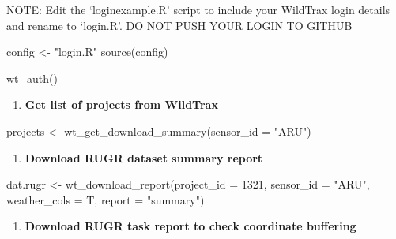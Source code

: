 \documentclass[
]{article}
\newenvironment{Shaded}{\begin{snugshade}}{\end{snugshade}}
\newcommand{\AttributeTok}[1]{\textcolor[rgb]{0.77,0.63,0.00}{#1}}
\newcommand{\DecValTok}[1]{\textcolor[rgb]{0.00,0.00,0.81}{#1}}
\newcommand{\FunctionTok}[1]{\textcolor[rgb]{0.00,0.00,0.00}{#1}}
\newcommand{\NormalTok}[1]{#1}
\newcommand{\OtherTok}[1]{\textcolor[rgb]{0.56,0.35,0.01}{#1}}
\newcommand{\StringTok}[1]{\textcolor[rgb]{0.31,0.60,0.02}{#1}}
\providecommand{\tightlist}{%
  \setlength{\itemsep}{0pt}\setlength{\parskip}{0pt}}
\begin{document}
NOTE: Edit the `loginexample.R' script to include your WildTrax login
details and rename to `login.R'. DO NOT PUSH YOUR LOGIN TO GITHUB

\begin{Shaded}
\begin{Highlighting}[]
\NormalTok{config }\OtherTok{\textless{}{-}} \StringTok{"login.R"}
\FunctionTok{source}\NormalTok{(config)}

\FunctionTok{wt\_auth}\NormalTok{()}
\end{Highlighting}
\end{Shaded}

\begin{enumerate}
\def\labelenumi{\arabic{enumi}.}
\setcounter{enumi}{2}
\tightlist
\item
  \textbf{Get list of projects from WildTrax}
\end{enumerate}

\begin{Shaded}
\begin{Highlighting}[]
\NormalTok{projects }\OtherTok{\textless{}{-}} \FunctionTok{wt\_get\_download\_summary}\NormalTok{(}\AttributeTok{sensor\_id =} \StringTok{"ARU"}\NormalTok{)}
\end{Highlighting}
\end{Shaded}

\begin{enumerate}
\def\labelenumi{\arabic{enumi}.}
\setcounter{enumi}{3}
\tightlist
\item
  \textbf{Download RUGR dataset summary report}
\end{enumerate}

\begin{Shaded}
\begin{Highlighting}[]
\NormalTok{dat.rugr }\OtherTok{\textless{}{-}} \FunctionTok{wt\_download\_report}\NormalTok{(}\AttributeTok{project\_id =} \DecValTok{1321}\NormalTok{, }\AttributeTok{sensor\_id =} \StringTok{"ARU"}\NormalTok{,}
    \AttributeTok{weather\_cols =}\NormalTok{ T, }\AttributeTok{report =} \StringTok{"summary"}\NormalTok{)}
\end{Highlighting}
\end{Shaded}

\begin{enumerate}
\def\labelenumi{\arabic{enumi}.}
\setcounter{enumi}{4}
\tightlist
\item
  \textbf{Download RUGR task report to check coordinate buffering}
\end{enumerate}
\end{document}
